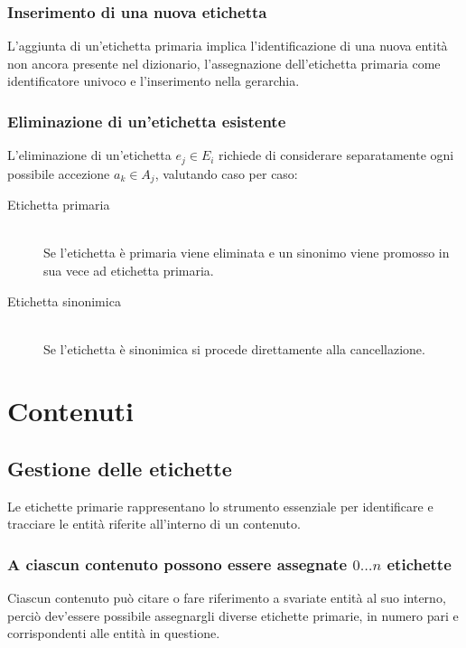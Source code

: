 \documentclass[10pt,a4paper,headinclude,footinclude,hidelinks]{scrreprt} %
\begin{document}
	\subsubsection{Inserimento di una nuova etichetta}
	L'aggiunta di un'etichetta primaria implica l'identificazione di una nuova entità non ancora presente nel dizionario, l'assegnazione dell'etichetta primaria come identificatore univoco e l'inserimento nella gerarchia.

	\subsubsection{Eliminazione di un'etichetta esistente}
	L'eliminazione di un'etichetta $e_j \in E_i$ richiede di considerare separatamente ogni possibile accezione $a_k \in A_j$, valutando caso per caso:
	\begin{description}
	\item[Etichetta primaria]\hfill \\
	Se l'etichetta è primaria viene eliminata e un sinonimo viene promosso in sua vece ad etichetta primaria.
 	\item[Etichetta sinonimica] \hfill \\
	Se l'etichetta è sinonimica si procede direttamente alla cancellazione.
	\end{description}

	\section{Contenuti}
	\label{sec:stage:requisiti:contenuti}

	\subsection{Gestione delle etichette}
	Le etichette primarie rappresentano lo strumento essenziale per identificare e tracciare le entità riferite all'interno di un contenuto.

	\subsubsection{A ciascun contenuto possono essere assegnate $0\ldots n$ etichette}
	Ciascun contenuto può citare o fare riferimento a svariate entità al suo interno, perciò dev'essere possibile assegnargli diverse etichette primarie, in numero pari e corrispondenti alle entità in questione.
\end{document}
